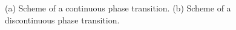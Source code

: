\documentclass[a4paper]{article}
\begin{document}
\begin{figure}
	\hfill
	\caption{(a) Scheme of a continuous phase transition. (b) Scheme of a discontinuous phase transition.}
	\label{Figure: Scheme of continuous and discontinuous phase transitions}
\end{figure}
\end{document}
